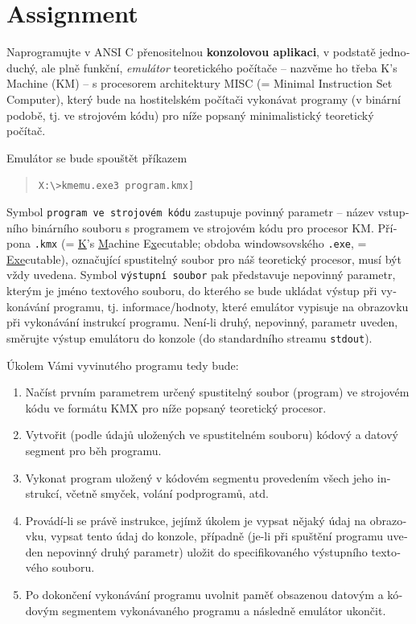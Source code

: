 \documentclass[12pt,a4paper]{paper}
\newcommand{\code}[1]{\texttt{#1}}
\begin{document}
\section{Assignment}
\begin{otherlanguage}{czech}

Naprogramujte v ANSI C přenositelnou \textbf{konzolovou aplikaci}, v podstatě
jednoduchý, ale plně funkční, \textit{emulátor} teoretického počítače – nazvěme
ho třeba K’s Machine (KM) – s procesorem architektury MISC (= Minimal
Instruction Set Computer), který bude na hostitelském počítači vykonávat
programy (v binární podobě, tj. ve strojovém kódu) pro níže popsaný
minimalistický teoretický počítač.

Emulátor se bude spouštět příkazem

\begin{quotation}
\code{X:\textbackslash>kmemu.exe3 \textlangle program.kmx\textrangle
[\textlangle výstupní soubor[.txt]\textrangle]}
\end{quotation}

Symbol \code{\textlangle program ve strojovém kódu\textrangle} zastupuje povinný
parametr – název vstupního binárního souboru s programem ve strojovém kódu pro
procesor KM. Přípona \code{.kmx} (\foreignlanguage{english}{= \underline{K}’s
\underline{M}achine E\underline{x}ecutable}; obdoba windowsovského \code{.exe},
\foreignlanguage{english}{= \underline{Exe}cutable}), označující spustitelný
soubor pro náš teoretický procesor, musí být vždy uvedena. Symbol
\code{\textlangle výstupní soubor\textrangle} pak představuje nepovinný
parametr, kterým je jméno textového souboru, do kterého se bude ukládat výstup
při vykonávání programu, tj. informace/hodnoty, které emulátor vypisuje na
obrazovku při vykonávání instrukcí programu. Není-li druhý, nepovinný, parametr
uveden, směrujte výstup emulátoru do konzole (do standardního streamu
\code{stdout}).

Úkolem Vámi vyvinutého programu tedy bude:

\begin{enumerate}
\item Načíst prvním parametrem určený spustitelný soubor (program) ve strojovém
    kódu ve formátu KMX pro níže popsaný teoretický procesor. \\
\item Vytvořit (podle údajů uložených ve spustitelném souboru) kódový a datový
    segment pro běh programu. \\
\item Vykonat program uložený v kódovém segmentu provedením všech jeho
    instrukcí, včetně smyček, volání podprogramů, atd. \\
\item Provádí-li se právě instrukce, jejímž úkolem je vypsat nějaký údaj na
    obrazovku, vypsat tento údaj do konzole, případně (je-li při spuštění
    programu uveden nepovinný druhý parametr) uložit do specifikovaného
    výstupního textového souboru. \\
\item Po dokončení vykonávání programu uvolnit paměť obsazenou datovým a kódovým
segmentem vykonávaného programu a následně emulátor ukončit. \\


\end{enumerate}
\end{otherlanguage}
\end{document}
